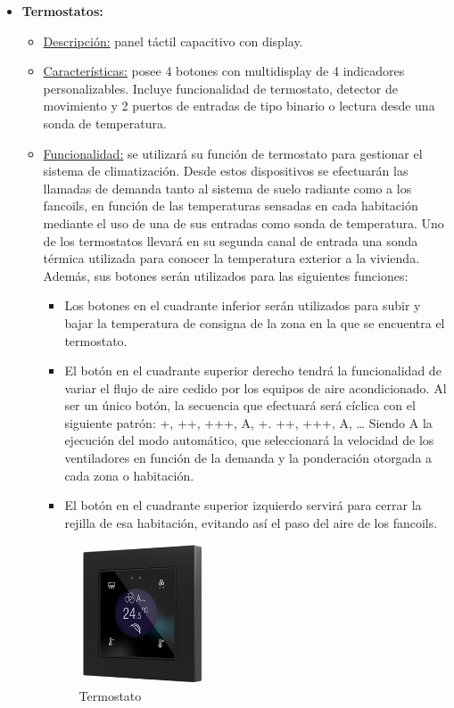 \begin{itemize}
\item \textbf{Termostatos:} 
	\begin{itemize}
	\item\underline{Descripción:} panel táctil capacitivo con display.
	\item \underline{Características:} posee 4 botones con multidisplay de 4 indicadores personalizables. Incluye funcionalidad de termostato, detector de movimiento y 2 puertos de entradas de tipo binario o lectura desde una sonda de temperatura.
	\item \underline{Funcionalidad:} se utilizará su función de termostato para gestionar el sistema de climatización. Desde estos dispositivos se efectuarán las llamadas de demanda tanto al sistema de suelo radiante como a los fancoils, en función de las temperaturas sensadas en cada habitación mediante el uso de una de sus entradas como sonda de temperatura. Uno de los termostatos llevará en su segunda canal de entrada una sonda térmica utilizada para conocer la temperatura exterior a la vivienda. Además, sus botones serán utilizados para las siguientes funciones:
		\begin{itemize}
		\item Los botones en el cuadrante inferior serán utilizados para subir y bajar la temperatura de consigna de la zona en la que se encuentra el termostato.
		\item El botón en el cuadrante superior derecho tendrá la funcionalidad de variar el flujo de aire cedido por los equipos de aire acondicionado. Al ser un único botón, la secuencia que efectuará será cíclica con el siguiente patrón: +, ++, +++, A, +. ++, +++, A, … Siendo A la ejecución del modo automático, que seleccionará la velocidad de los ventiladores en función de la demanda y la ponderación otorgada a cada zona o habitación.
		\item El botón en el cuadrante superior izquierdo servirá para cerrar la rejilla de esa habitación, evitando así el paso del aire de los fancoils.
		\end{itemize} 
	\begin{figure}[H]
	\centering
	\includegraphics[width=0.37\textwidth]{figures/termostato.png}   
	\caption{Termostato}
	\label{fig:termostato}
	\end{figure}
	\end{itemize} 


\end{itemize}
